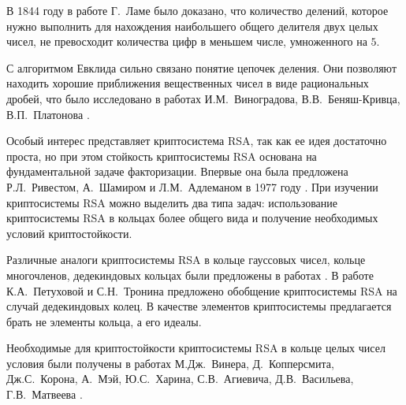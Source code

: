 \documentclass[_00_dissertation.tex]{subfiles}
\begin{document}
В 1844 году в работе Г.~Ламе было доказано, что количество делений, которое нужно выполнить для нахождения наибольшего общего делителя двух целых чисел, не превосходит количества цифр в меньшем числе, умноженного на $5$.

С алгоритмом Евклида сильно связано понятие цепочек деления.
Они позволяют находить хорошие приближения вещественных чисел в виде рациональных дробей, что было исследовано в работах И.М.~Виноградова,  В.В.~Беняш-Кривца, В.П.~Платонова \cite{source:Vinogradov, source:Benyash-Krivets_1, source:Benyash-Krivets_2}.

Особый интерес представляет криптосистема RSA, так как ее идея достаточно проста, но при этом стойкость криптосистемы RSA основана на фундаментальной задаче факторизации.
Впервые она была предложена Р.Л.~Ривестом, А.~Шамиром и Л.М.~Адлеманом в 1977 году \cite{source:Rivest}.
При изучении криптосистемы RSA можно выделить два типа задач: использование криптосистемы RSA в кольцах более общего вида и получение необходимых условий криптостойкости.

Различные аналоги криптосистемы RSA в кольце гауссовых чисел, кольце многочленов, дедекиндовых кольцах были предложены в работах \cite{source:Li, source:El_Kassar, source:Elkamchouchi, source:Koval, source:El_Kassar}.
В работе К.А.~Петуховой и С.Н.~Тронина \cite{source:Petukhova} предложено обобщение криптосистемы RSA на случай дедекиндовых колец.
В качестве элементов криптосистемы предлагается брать не элементы кольца, а его идеалы.

Необходимые для криптостойкости криптосистемы RSA в кольце целых чисел условия были получены в работах М.Дж.~Винера, Д.~Копперсмита, Дж.С.~Корона, А.~Мэй, Ю.С.~Харина, С.В.~Агиевича, Д.В.~Васильева, Г.В.~Матвеева \cite{source:Wiener, source:Coppersmith, source:Coron, source:Kharin, source:Matveev_2019, source:Matveev_2018}.

\onlyinsubfile{
    
}
\end{document}
